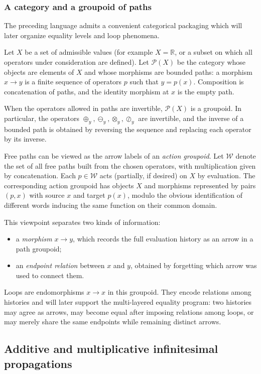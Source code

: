 \subsubsection*{A category and a groupoid of paths}
The preceding language admits a convenient categorical packaging which will later organize equality levels and loop phenomena.

Let $X$ be a set of admissible values (for example $X=\mathbb{R}$, or a subset on which all operators under consideration are defined). Let $\mathcal{P}(X)$ be the category whose objects are elements of $X$ and whose morphisms are bounded paths: a morphism $x\to y$ is a finite sequence of operators $p$ such that $y=p(x)$. Composition is concatenation of paths, and the identity morphism at $x$ is the empty path.

When the operators allowed in paths are invertible, $\mathcal{P}(X)$ is a groupoid. In particular, the operators $\oplus_y,\ominus_y,\otimes_y,\oslash_y$ are invertible, and the inverse of a bounded path is obtained by reversing the sequence and replacing each operator by its inverse.

Free paths can be viewed as the arrow labels of an \emph{action groupoid}. Let $\mathcal{W}$ denote the set of all free paths built from the chosen operators, with multiplication given by concatenation. Each $p\in\mathcal{W}$ acts (partially, if desired) on $X$ by evaluation. The corresponding action groupoid has objects $X$ and morphisms represented by pairs $(p,x)$ with source $x$ and target $p(x)$, modulo the obvious identification of different words inducing the same function on their common domain.

This viewpoint separates two kinds of information:
\begin{itemize}
    \item a \emph{morphism} $x\to y$, which records the full evaluation history as an arrow in a path groupoid;
    \item an \emph{endpoint relation} between $x$ and $y$, obtained by forgetting which arrow was used to connect them.
\end{itemize}
Loops are endomorphisms $x\to x$ in this groupoid. They encode relations among histories and will later support the multi-layered equality program: two histories may agree as arrows, may become equal after imposing relations among loops, or may merely share the same endpoints while remaining distinct arrows.

\subsection{Additive and multiplicative infinitesimal propagations}\label{subsec:flow-propagations}


